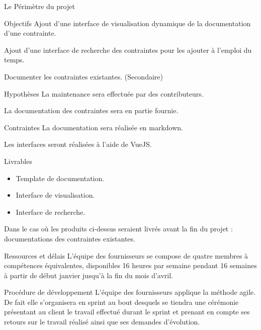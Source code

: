 \documentclass[]{article}
\begin{document}
    \begin{section}{Le Périmètre du projet}
        \begin{subsection}{Objectifs}
            Ajout d’une interface de visualisation dynamique de la documentation d’une contrainte.

            Ajout d’une interface de recherche des contraintes pour les ajouter à l’emploi du temps.

            Documenter les contraintes existantes. (Secondaire)
        \end{subsection}

        \begin{subsection}{Hypothèses}
            La maintenance sera effectuée par des contributeurs.

            La documentation des contraintes sera en partie fournie.
        \end{subsection}

        \begin{subsection}{Contraintes}
            La documentation sera réalisée en markdown.

            Les interfaces seront réalisées à l’aide de VueJS.
        \end{subsection}

        \begin{subsection}{Livrables}
            \begin{itemize}
                \item Template de documentation.
                \item Interface de visualisation.
                \item Interface de recherche.
            \end{itemize}

            Dans le cas où les produits ci-dessus seraient livrés avant la fin du projet : 
            documentations des contraintes existantes.
        \end{subsection}

        \begin{subsection}{Ressources et délais}
            L’équipe des fournisseurs se compose de quatre membres à compétences équivalentes, disponibles 16 heures par semaine 
            pendant 16 semaines à partir de début janvier jusqu'à la fin du mois d'avril.           
        \end{subsection}

        \begin{subsection}{Procédure de développement}
            L’équipe des fournisseurs applique la méthode agile. De fait elle s’organisera en sprint au bout desquels se tiendra 
            une cérémonie présentant au client le travail effectué durant le sprint et prenant en compte ses retours sur le 
            travail réalisé ainsi que ses demandes d’évolution.


\end{subsection}
\end{section}
\end{document}
